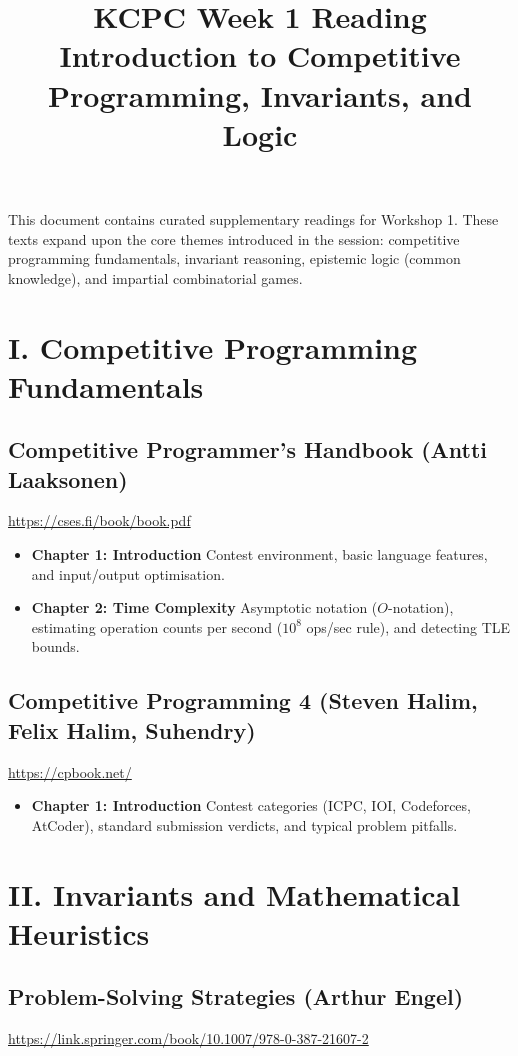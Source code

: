 \documentclass[11pt]{article}
\title{KCPC Week 1 Reading\\Introduction to Competitive Programming, Invariants, and Logic}
\author{}
\date{}
\begin{document}
\maketitle
\thispagestyle{fancy}

\noindent
This document contains curated supplementary readings for Workshop 1. These texts expand upon the core themes introduced in the session: competitive programming fundamentals, invariant reasoning, epistemic logic (common knowledge), and impartial combinatorial games.

\section*{I. Competitive Programming Fundamentals}

\subsection*{Competitive Programmer's Handbook (Antti Laaksonen)}
\url{https://cses.fi/book/book.pdf}

\begin{itemize}
    \item \textbf{Chapter 1: Introduction} Contest environment, basic language features, and input/output optimisation.
    \item \textbf{Chapter 2: Time Complexity} Asymptotic notation ($O$-notation), estimating operation counts per second ($10^8$ ops/sec rule), and detecting TLE bounds.
\end{itemize}

\subsection*{Competitive Programming 4 (Steven Halim, Felix Halim, Suhendry)}
\url{https://cpbook.net/}

\begin{itemize}
    \item \textbf{Chapter 1: Introduction} Contest categories (ICPC, IOI, Codeforces, AtCoder), standard submission verdicts, and typical problem pitfalls.
\end{itemize}

\section*{II. Invariants and Mathematical Heuristics}

\subsection*{Problem-Solving Strategies (Arthur Engel)}
\url{https://link.springer.com/book/10.1007/978-0-387-21607-2}
\end{document}
